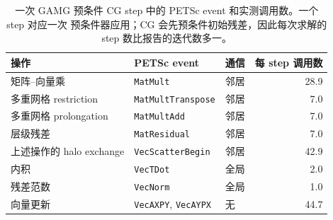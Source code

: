 \documentclass[11pt,a4paper,oneside]{report}
\begin{document}
\begin{table}[htbp]
  \centering
  \caption{一次 GAMG 预条件 CG step 中的 PETSc event 和实测调用数。一个 step 对应一次
  预条件器应用；CG 会先预条件初始残差，因此每次求解的 step 数比报告的迭代数多一。}
  \label{tab:cg-ops}
  \begin{tabular}{lllr}
    \toprule
    操作 & PETSc event & 通信 & 每 step 调用数 \\
    \midrule
    矩阵--向量乘   & \texttt{MatMult}          & 邻居 &  28.9 \\
    多重网格 restriction   & \texttt{MatMultTranspose} & 邻居 &   7.0 \\
    多重网格 prolongation  & \texttt{MatMultAdd}       & 邻居 &   7.0 \\
    层级残差          & \texttt{MatResidual}      & 邻居 &   7.0 \\
    \addlinespace
    上述操作的 halo exchange & \texttt{VecScatterBegin} & 邻居 & 42.9 \\
    \addlinespace
    内积          & \texttt{VecTDot}          & 全局    &   2.0 \\
    残差范数           & \texttt{VecNorm}          & 全局    &   1.0 \\
    向量更新          & \texttt{VecAXPY}, \texttt{VecAYPX} & 无 & 44.7 \\
    \bottomrule
  \end{tabular}
\end{table}
\end{document}
